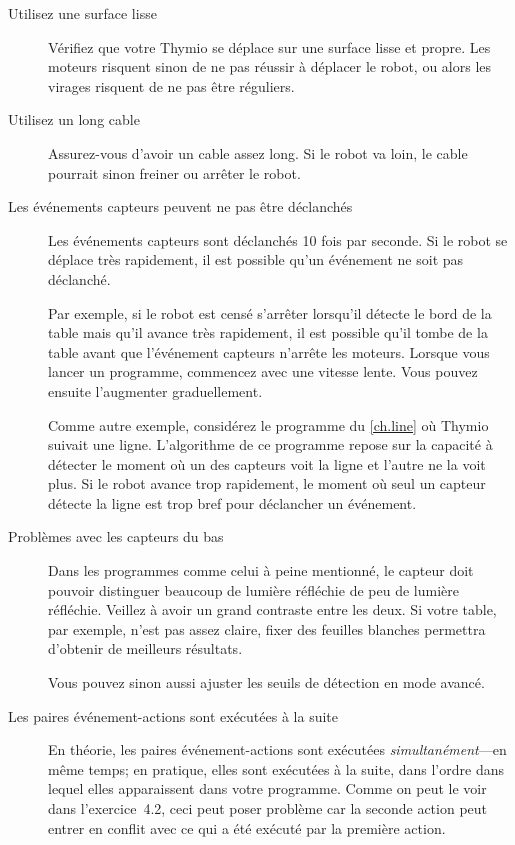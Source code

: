 \begin{description}

\item[Utilisez une surface lisse]
Vérifiez que votre Thymio se déplace sur une surface lisse et propre.
Les moteurs risquent sinon de ne pas réussir à déplacer le robot,
ou alors les virages risquent de ne pas être réguliers.

\item[Utilisez un long cable]
Assurez-vous d'avoir un cable assez long.
Si le robot va loin, le cable pourrait sinon freiner ou arrêter le robot.

\item[Les événements capteurs peuvent ne pas être déclanchés]
Les événements capteurs sont déclanchés 10 fois par seconde.
Si le robot se déplace très rapidement, il est possible qu'un événement ne soit pas déclanché.

Par exemple, si le robot est censé s'arrêter lorsqu'il détecte le bord de la table
mais qu'il avance très rapidement, il est possible qu'il tombe de la table
avant que l'événement capteurs n'arrête les moteurs.
Lorsque vous lancer un programme, commencez avec une vitesse lente.
Vous pouvez ensuite l'augmenter graduellement.

Comme autre exemple, considérez le programme du \cref{ch.line} où Thymio suivait une ligne.
L'algorithme de ce programme repose sur la capacité à détecter le moment où
un des capteurs voit la ligne et l'autre ne la voit plus.
Si le robot avance trop rapidement, le moment où seul un capteur détecte la ligne 
est trop bref pour déclancher un événement.

\item[Problèmes avec les capteurs du bas]
Dans les programmes comme celui à peine mentionné,
le capteur doit pouvoir distinguer beaucoup de lumière réfléchie de peu de lumière réfléchie.
Veillez à avoir un grand contraste entre les deux.
Si votre table, par exemple, n'est pas assez claire, fixer des feuilles blanches 
permettra d'obtenir de meilleurs résultats.

Vous pouvez sinon aussi ajuster les seuils de détection en mode avancé.

\item[Les paires événement-actions sont exécutées à la suite]
En théorie, les paires événement-actions sont exécutées \emph{simultanément}---en même temps;
en pratique, elles sont exécutées à la suite, dans l'ordre dans lequel elles apparaissent 
dans votre programme.
Comme on peut le voir dans l'exercice~4.2, ceci peut poser problème car la seconde action
peut entrer en conflit avec ce qui a été exécuté par la première action.


\end{description}
